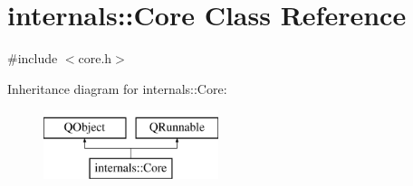 \hypertarget{classinternals_1_1_core}{\section{internals\-:\-:Core Class Reference}
\label{classinternals_1_1_core}
}


{\ttfamily \#include $<$core.\-h$>$}

Inheritance diagram for internals\-:\-:Core\-:\begin{figure}[H]
\begin{center}
\leavevmode
\includegraphics[height=2.000000cm]{classinternals_1_1_core}
\end{center}
\end{figure}
